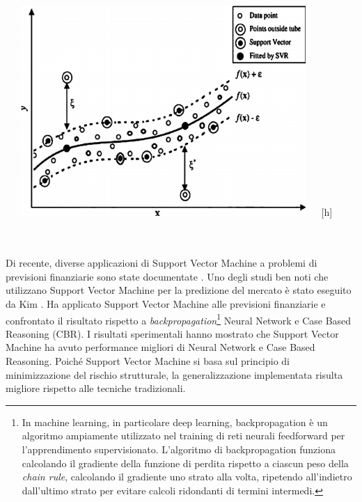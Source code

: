 \documentclass[a4paper,12pt]{report}
\begin{document}
\begin{fig}
	\begin{center}
		\includegraphics[width=12cm,height=8cm]{svm1}[h]
	\end{center}
	\label{Figura 7}
\end{fig}

\\~\\Di recente, diverse applicazioni di Support Vector Machine a problemi di previsioni finanziarie sono state documentate \cite{15}\cite{38}\cite{39}. Uno degli studi ben noti che utilizzano Support Vector Machine per la predizione del mercato è stato eseguito da Kim \cite{15}. Ha applicato Support Vector Machine alle previsioni finanziarie e confrontato il risultato rispetto a \textit{backpropagation}\footnote{In machine learning, in particolare deep learning, backpropagation è un algoritmo ampiamente utilizzato nel training di reti neurali feedforward per l'apprendimento supervisionato. L'algoritmo di backpropagation funziona calcolando il gradiente della funzione di perdita rispetto a ciascun peso della \textit{chain rule}, calcolando il gradiente uno strato alla volta, ripetendo all'indietro dall'ultimo strato per evitare calcoli ridondanti di termini intermedi.} Neural Network e Case Based Reasoning (CBR). I risultati sperimentali hanno mostrato che Support Vector Machine ha avuto performance migliori di Neural Network e Case Based Reasoning. Poiché Support Vector Machine si basa sul principio di minimizzazione del rischio strutturale, la generalizzazione implementata risulta migliore rispetto alle tecniche tradizionali.
\end{document}
